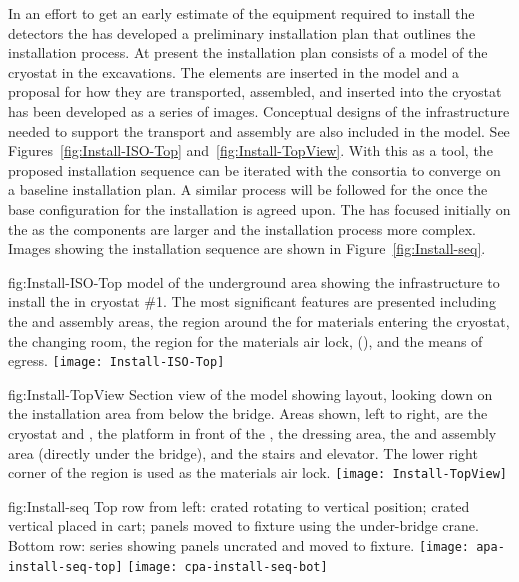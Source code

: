 In an effort to get an early estimate of the equipment required to
install the detectors the  has developed a preliminary
installation plan that outlines the installation process. At present
the installation plan consists of a \threed model of the cryostat in the
excavations. The  elements are inserted in the
model and a proposal for how they are transported, assembled, and
inserted into the cryostat has been developed as a series of images. %
%
Conceptual designs of the infrastructure needed to support
the transport and assembly are also included in the model. See Figures~\ref{fig:Install-ISO-Top} and~\ref{fig:Install-TopView}. With this
as a tool, the proposed installation sequence can be iterated with the
consortia to converge on a baseline installation plan. A similar
process will be followed for the  once the base
configuration for the  installation is agreed upon. The
 has focused initially on the  as the
 components are larger and the installation process more
complex. Images showing the  installation sequence are shown
in Figure~\ref{fig:Install-seq}.

\begin{dunefigure}{fig:Install-ISO-Top}
  {\threed model of the underground area showing the infrastructure to install the  in cryostat \#1. The most significant features are presented including the  and  assembly areas, the region around the  for materials entering the cryostat,  the changing room, the region for the materials air lock, (), 
  and the means of egress.}
\texttt{[image: Install-ISO-Top]}
\end{dunefigure}

\begin{dunefigure}{fig:Install-TopView}
  {Section view of the \threed model showing layout, looking down on the installation area from below the bridge. Areas shown, left to right,  are the cryostat and , the platform in front of the , the dressing area, the  and  assembly area (directly under the bridge), and the stairs and elevator. The lower right corner of the region is used as the materials air lock.}
\texttt{[image: Install-TopView]}
\end{dunefigure}

\begin{dunefigure}{fig:Install-seq}
  {Top row from left:  crated  rotating to vertical position;  crated vertical  placed in cart;  panels moved to fixture using the under-bridge crane. Bottom row: series showing  panels uncrated and moved to fixture. }
\texttt{[image: apa-install-seq-top]}
\texttt{[image: cpa-install-seq-bot]}
\end{dunefigure}




